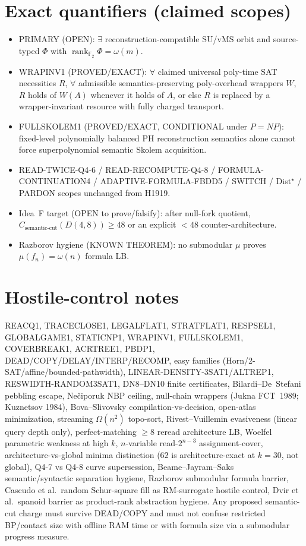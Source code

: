 \documentclass[11pt]{article}
\begin{document}
\section*{Exact quantifiers (claimed scopes)}
\begin{itemize}
\item PRIMARY (OPEN): $\exists$ reconstruction-compatible SU/vMS orbit and source-typed
  $\Phi$ with $\operatorname{rank}_{\mathbb F_2}\Phi=\omega(m)$.
\item WRAPINV1 (PROVED/EXACT): $\forall$ claimed universal poly-time SAT necessities $R$,
  $\forall$ admissible semantics-preserving poly-overhead wrappers $W$, $R$ holds of $W(A)$
  whenever it holds of $A$, or else $R$ is replaced by a wrapper-invariant resource with
  fully charged transport.
\item FULLSKOLEM1 (PROVED/EXACT, CONDITIONAL under $P=NP$): fixed-level polynomially
  balanced PH reconstruction semantics alone cannot force superpolynomial semantic Skolem
  acquisition.
\item READ-TWICE-Q4-6 / READ-RECOMPUTE-Q4-8 / FORMULA-CONTINUATION4 / ADAPTIVE-FORMULA-FBDD5 /
  SWITCH / Dist$^\star$ / PARDON scopes unchanged from H1919.
\item Idea~F target (OPEN to prove/falsify): after null-fork quotient,
  $C_{\mathrm{semantic\textrm{-}cut}}(D(4,8))\ge 48$ or an explicit $<48$ counter-architecture.
\item Razborov hygiene (KNOWN THEOREM): no submodular $\mu$ proves $\mu(f_n)=\omega(n)$ formula LB.
\end{itemize}

\section*{Hostile-control notes}
REACQ1, TRACECLOSE1, LEGALFLAT1, STRATFLAT1, RESPSEL1, GLOBALGAME1, STATICNP1, WRAPINV1,
FULLSKOLEM1, COVERBREAK1, ACRTREE1, PBDP1, DEAD/COPY/DELAY/INTERP/RECOMP, easy families
(Horn/2-SAT/affine/bounded-pathwidth), LINEAR-DENSITY-3SAT1/ALTREP1, RESWIDTH-RANDOM3SAT1,
DN8--DN10 finite certificates, Bilardi--De~Stefani pebbling escape, Ne\v{c}iporuk NBP ceiling,
null-chain wrappers (Jukna FCT~1989; Kuznetsov 1984), Bova--Slivovsky compilation-vs-decision,
open-atlas minimization, streaming $\Omega(n^2)$ topo-sort, Rivest--Vuillemin evasiveness
(linear query depth only), perfect-matching $\ge8$ reread architecture LB, Woelfel parametric
weakness at high $k$, $n$-variable read-$2^{n-3}$ assignment-cover, architecture-vs-global
minima distinction ($62$ is architecture-exact at $k=30$, not global), Q4-7 vs Q4-8 curve
supersession, Beame--Jayram--Saks semantic/syntactic separation hygiene,
Razborov submodular formula barrier, Cascudo et al.\ random Schur-square fill as RM-surrogate
hostile control, Dvir et al.\ spanoid barrier as product-rank abstraction hygiene.
Any proposed semantic-cut charge must survive DEAD/COPY and must not confuse restricted
BP/contact size with offline RAM time or with formula size via a submodular progress measure.
\end{document}
